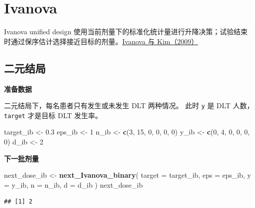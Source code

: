 \documentclass[
  chinese,
]{article}
\newenvironment{Shaded}{\begin{snugshade}}{\end{snugshade}}
\newcommand{\AttributeTok}[1]{\textcolor[rgb]{0.13,0.29,0.53}{#1}}
\newcommand{\DecValTok}[1]{\textcolor[rgb]{0.00,0.00,0.81}{#1}}
\newcommand{\FloatTok}[1]{\textcolor[rgb]{0.00,0.00,0.81}{#1}}
\newcommand{\FunctionTok}[1]{\textcolor[rgb]{0.13,0.29,0.53}{\textbf{#1}}}
\newcommand{\NormalTok}[1]{#1}
\newcommand{\OtherTok}[1]{\textcolor[rgb]{0.56,0.35,0.01}{#1}}
\begin{document}
\section{Ivanova}\label{ivanova}

Ivanova unified design
使用当前剂量下的标准化统计量进行升降决策；试验结束时通过保序估计选择接近目标的剂量。\hyperref[ux53c2ux8003ux8d44ux6599]{Ivanova
与 Kim（2009）}

\subsection{二元结局}\label{ux4e8cux5143ux7ed3ux5c40}

\textbf{准备数据}

二元结局下，每名患者只有发生或未发生 DLT 两种情况。 此时 \texttt{y} 是
DLT 人数，\texttt{target} 才是目标 DLT 发生率。

\begin{Shaded}
\begin{Highlighting}[]
\NormalTok{target\_ib }\OtherTok{\textless{}{-}} \FloatTok{0.3}
\NormalTok{eps\_ib }\OtherTok{\textless{}{-}} \DecValTok{1}
\NormalTok{n\_ib }\OtherTok{\textless{}{-}} \FunctionTok{c}\NormalTok{(}\DecValTok{3}\NormalTok{, }\DecValTok{15}\NormalTok{, }\DecValTok{0}\NormalTok{, }\DecValTok{0}\NormalTok{, }\DecValTok{0}\NormalTok{, }\DecValTok{0}\NormalTok{)}
\NormalTok{y\_ib }\OtherTok{\textless{}{-}} \FunctionTok{c}\NormalTok{(}\DecValTok{0}\NormalTok{, }\DecValTok{4}\NormalTok{, }\DecValTok{0}\NormalTok{, }\DecValTok{0}\NormalTok{, }\DecValTok{0}\NormalTok{, }\DecValTok{0}\NormalTok{)}
\NormalTok{d\_ib }\OtherTok{\textless{}{-}} \DecValTok{2}
\end{Highlighting}
\end{Shaded}

\textbf{下一批剂量}

\begin{Shaded}
\begin{Highlighting}[]
\NormalTok{next\_dose\_ib }\OtherTok{\textless{}{-}} \FunctionTok{next\_Ivanova\_binary}\NormalTok{(}
  \AttributeTok{target =}\NormalTok{ target\_ib, }\AttributeTok{eps =}\NormalTok{ eps\_ib, }\AttributeTok{y =}\NormalTok{ y\_ib, }\AttributeTok{n =}\NormalTok{ n\_ib, }\AttributeTok{d =}\NormalTok{ d\_ib}
\NormalTok{)}
\NormalTok{next\_dose\_ib}
\end{Highlighting}
\end{Shaded}

\begin{verbatim}
## [1] 2
\end{verbatim}
\end{document}
